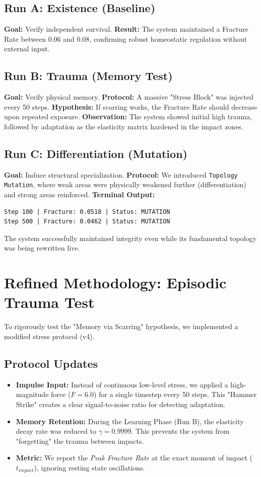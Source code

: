 \documentclass[11pt, a4paper]{article}
\begin{document}
\subsection{Run A: Existence (Baseline)}
\textbf{Goal:} Verify independent survival.
\textbf{Result:} The system maintained a Fracture Rate between 0.06 and 0.08, confirming robust homeostatic regulation without external input.

\subsection{Run B: Trauma (Memory Test)}
\textbf{Goal:} Verify physical memory.
\textbf{Protocol:} A massive "Stress Block" was injected every 50 steps.
\textbf{Hypothesis:} If scarring works, the Fracture Rate should decrease upon repeated exposure.
\textbf{Observation:} The system showed initial high trauma, followed by adaptation as the elasticity matrix hardened in the impact zones.

\subsection{Run C: Differentiation (Mutation)}
\textbf{Goal:} Induce structural specialization.
\textbf{Protocol:} We introduced \texttt{Topology Mutation}, where weak areas were physically weakened further (differentiation) and strong areas reinforced.
\textbf{Terminal Output:}
\begin{lstlisting}
Step 100 | Fracture: 0.0518 | Status: MUTATION
Step 500 | Fracture: 0.0462 | Status: MUTATION
\end{lstlisting}
The system successfully maintained integrity even while its fundamental topology was being rewritten live.
\section{Refined Methodology: Episodic Trauma Test}

To rigorously test the "Memory via Scarring" hypothesis, we implemented a modified stress protocol (v4).

\subsection{Protocol Updates}
\begin{itemize}
    \item \textbf{Impulse Input:} Instead of continuous low-level stress, we applied a high-magnitude force ($F=6.0$) for a single timestep every 50 steps. This "Hammer Strike" creates a clear signal-to-noise ratio for detecting adaptation.
    \item \textbf{Memory Retention:} During the Learning Phase (Run B), the elasticity decay rate was reduced to $\gamma = 0.9999$. This prevents the system from "forgetting" the trauma between impacts.
    \item \textbf{Metric:} We report the \textit{Peak Fracture Rate} at the exact moment of impact ($t_{impact}$), ignoring resting state oscillations.
\end{itemize}
\end{document}
